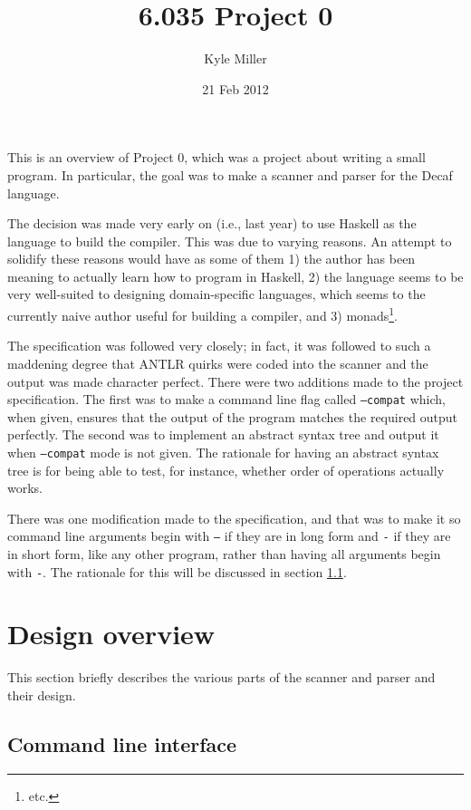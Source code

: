 \documentclass[11pt]{article}
\title{6.035 Project 0}
\author{Kyle Miller}
\date{21 Feb 2012}
\begin{document}
\maketitle

This is an overview of Project 0, which was a project about writing a
small program.  In particular, the goal was to make a scanner and
parser for the Decaf language.

The decision was made very early on (i.e., last year) to use Haskell
as the language to build the compiler.  This was due to varying
reasons.  An attempt to solidify these reasons would have as some of
them 1) the author has been meaning to actually learn how to program
in Haskell, 2) the language seems to be very well-suited to designing
domain-specific languages, which seems to the currently naive author
useful for building a compiler, and 3) monads\footnote{etc.}.

The specification was followed very closely; in fact, it was followed
to such a maddening degree that ANTLR quirks were coded into the
scanner and the output was made character perfect.  There were two
additions made to the project specification.  The first was to make a
command line flag called \texttt{--compat} which, when given, ensures
that the output of the program matches the required output perfectly.
The second was to implement an abstract syntax tree and output it when
\texttt{--compat} mode is not given.  The rationale for having an
abstract syntax tree is for being able to test, for instance, whether
order of operations actually works.

There was one modification made to the specification, and that was to
make it so command line arguments begin with \texttt{--} if they are
in long form and \texttt{-} if they are in short form, like any other
program, rather than having all arguments begin with \texttt{-}.  The
rationale for this will be discussed in section
\ref{sec:comm-line-interf}.

\section{Design overview}
\label{sec:design-overview}

This section briefly describes the various parts of the scanner and
parser and their design.

\subsection{Command line interface}
\label{sec:comm-line-interf}
\end{document}
